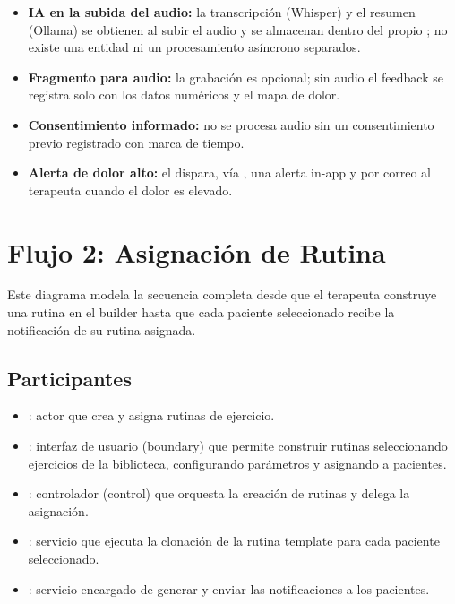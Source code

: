 \begin{itemize}
  \item \textbf{IA en la subida del audio:} la transcripción (Whisper) y el resumen (Ollama) se obtienen al subir el audio y se almacenan dentro del propio ; no existe una entidad ni un procesamiento asíncrono separados.
  \item \textbf{Fragmento  para audio:} la grabación es opcional; sin audio el feedback se registra solo con los datos numéricos y el mapa de dolor.
  \item \textbf{Consentimiento informado:} no se procesa audio sin un consentimiento previo registrado con marca de tiempo.
  \item \textbf{Alerta de dolor alto:} el  dispara, vía , una alerta in-app y por correo al terapeuta cuando el dolor es elevado.
\end{itemize}

\section{Flujo 2: Asignación de Rutina}\label{sec:sec-asignacion}

Este diagrama modela la secuencia completa desde que el terapeuta construye una rutina en el builder hasta que cada paciente seleccionado recibe la notificación de su rutina asignada.

\subsection{Participantes}

\begin{itemize}
  \item {}: actor que crea y asigna rutinas de ejercicio.
  \item {}: interfaz de usuario (boundary) que permite construir rutinas seleccionando ejercicios de la biblioteca, configurando parámetros y asignando a pacientes.
  \item {}: controlador (control) que orquesta la creación de rutinas y delega la asignación.
  \item {}: servicio que ejecuta la clonación de la rutina template para cada paciente seleccionado.
  \item {}: servicio encargado de generar y enviar las notificaciones a los pacientes.
\end{itemize}

